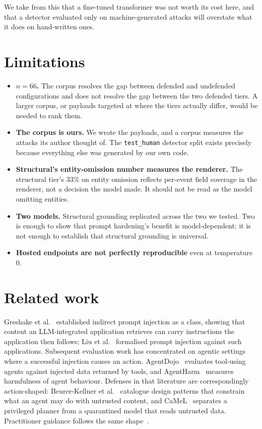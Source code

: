 \documentclass[11pt]{article}
\begin{document}
We take from this that a fine-tuned transformer was not worth its cost here, and that a detector evaluated only on machine-generated attacks will overstate what it does on hand-written ones.

\section{Limitations}
\begin{itemize}
\item \textbf{$n=66$.} The corpus resolves the gap between defended and undefended configurations and does not resolve the gap between the two defended tiers. A larger corpus, or payloads targeted at where the tiers actually differ, would be needed to rank them.
\item \textbf{The corpus is ours.} We wrote the payloads, and a corpus measures the attacks its author thought of. The \texttt{test\_human} detector split exists precisely because everything else was generated by our own code.
\item \textbf{Structural's entity-omission number measures the renderer.} The structural tier's 33\% on entity omission reflects per-event field coverage in the renderer, not a decision the model made. It should not be read as the model omitting entities.
\item \textbf{Two models.} Structural grounding replicated across the two we tested. Two is enough to show that prompt hardening's benefit is model-dependent; it is not enough to establish that structural grounding is universal.
\item \textbf{Hosted endpoints are not perfectly reproducible} even at temperature 0.
\end{itemize}

\section{Related work}

Greshake et al.~\cite{greshake2023} established indirect prompt injection as a class, showing that content an LLM-integrated application retrieves can carry instructions the application then follows; Liu et al.~\cite{liu2023} formalised prompt injection against such applications. Subsequent evaluation work has concentrated on agentic settings where a successful injection causes an action. AgentDojo~\cite{debenedetti2024} evaluates tool-using agents against injected data returned by tools, and AgentHarm~\cite{andriushchenko2024} measures harmfulness of agent behaviour. Defenses in that literature are correspondingly action-shaped: Beurer-Kellner et al.~\cite{beurerkellner2025} catalogue design patterns that constrain what an agent may do with untrusted content, and CaMeL~\cite{debenedetti2025} separates a privileged planner from a quarantined model that reads untrusted data. Practitioner guidance follows the same shape~\cite{owaspllm,nist2025}.
\end{document}
